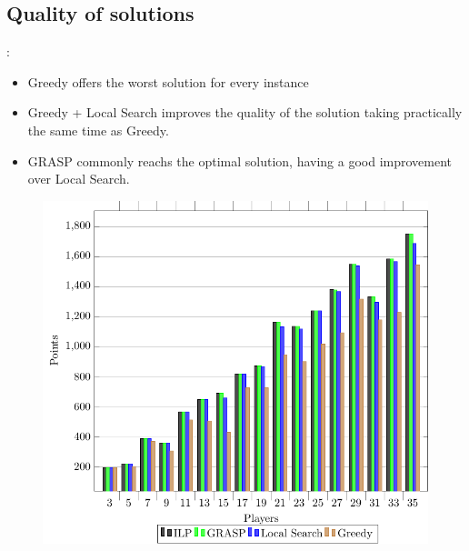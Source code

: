 \documentclass[9pt, aspectratio=169, xcolor=table]{beamer}
\begin{document}
\subsection{Quality of solutions}
\begin{frame}{\secname: \subsecname}
    \begin{minipage}{0.44\textwidth}
	\begin{itemize}
	    \item Greedy offers the worst solution for every instance
	    \item Greedy + Local Search improves the quality of the solution taking practically the same time as Greedy.
      \item GRASP commonly reachs the optimal solution, having a good improvement over Local  Search.
	\end{itemize}
    \end{minipage}
    \hfill
    \begin{minipage}{0.52\textwidth}
	\centering
	\begin{figure}[H]
	    \centering
	    \includegraphics[width=\linewidth]{../plots/solutions.pdf}
	\end{figure}
    \end{minipage}
\end{frame}


\end{document}

